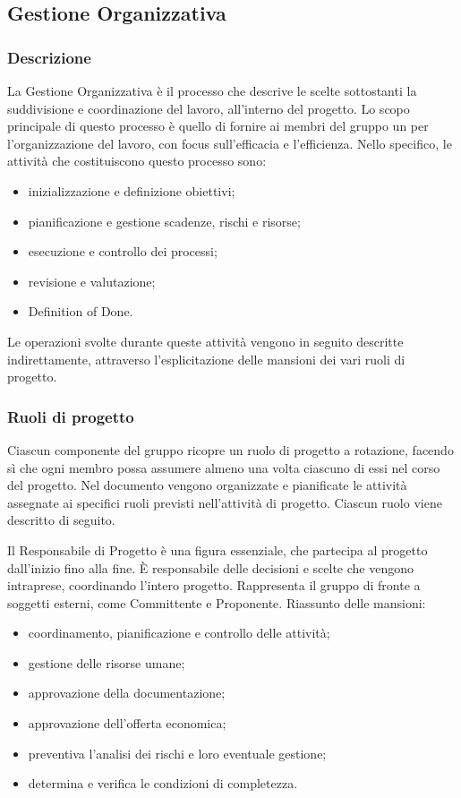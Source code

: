 \subsection{Gestione Organizzativa}
	
		\subsubsection{Descrizione}
			La Gestione Organizzativa è il processo che descrive le scelte sottostanti la suddivisione e coordinazione del lavoro, all'interno del progetto. Lo scopo principale di questo processo è quello di fornire ai membri del gruppo un \PdP{} per l'organizzazione del lavoro, con focus sull'efficacia e l'efficienza. Nello specifico, le attività che costituiscono questo processo sono:
			\begin{itemize}
				\item {inizializzazione e definizione obiettivi;}
				\item {pianificazione e gestione scadenze, rischi e risorse;}
				\item {esecuzione e controllo dei processi;}
				\item {revisione e valutazione;}
				\item {Definition of Done.}
			\end{itemize}
			Le operazioni svolte durante queste attività vengono in seguito descritte indirettamente, attraverso l'esplicitazione delle mansioni dei vari ruoli di progetto.
			
			\subsubsection{Ruoli di progetto}
			Ciascun componente del gruppo ricopre un ruolo di progetto a rotazione, facendo sì che ogni membro possa assumere almeno una volta ciascuno di essi nel corso del progetto. Nel documento \PdP{} vengono organizzate e pianificate le attività assegnate ai specifici ruoli previsti nell'attività di progetto. Ciascun ruolo viene descritto di seguito.
			
			Il Responsabile di Progetto è una figura essenziale, che partecipa al progetto dall'inizio fino alla fine. È responsabile delle decisioni e scelte che vengono intraprese, coordinando l'intero progetto. Rappresenta il gruppo di fronte a soggetti esterni, come Committente e Proponente.
			Riassunto delle mansioni:
			\begin{itemize}
				\item coordinamento, pianificazione e controllo delle attività;
				\item gestione delle risorse umane;
				\item approvazione della documentazione;
				\item approvazione dell'offerta economica;
				\item preventiva l'analisi dei rischi e loro eventuale gestione;
				\item determina e verifica le condizioni di completezza.
			\end{itemize}
			
